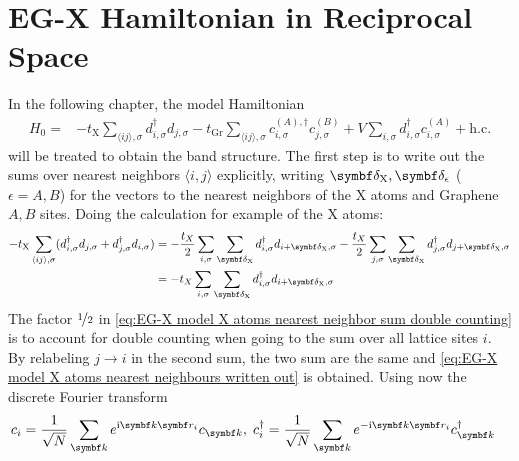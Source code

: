 \documentclass[../main.tex]{subfiles}
\begin{document}
	\chapter{EG-X Hamiltonian in Reciprocal Space}
	
	
	In the following chapter, the model Hamiltonian
	\begin{align}
		H_0 = &-t_{\mathrm{X}} \sum_{\langle ij \rangle, \sigma} d_{i, \sigma}^{\dagger} d_{j, \sigma}
		-t_{\mathrm{Gr}} \sum_{\langle ij \rangle, \sigma}
		c_{i, \sigma}^{(A), \dagger} c_{j, \sigma}^{(B)}
		+ V \sum_{i, \sigma} d_{i, \sigma}^{\dagger} c_{i, \sigma}^{(A)} + \mathrm{h.c.} \label{eq:EG-X model Hamiltonian non-interacting appendix}
	\end{align}
	will be treated to obtain the band structure. The first step is to write out the sums over nearest neighbors \(\langle i, j \rangle\) explicitly, writing \(\vb{\delta}_{\mathrm{X}}, \vb{\delta}_{\epsilon}\) (\(\epsilon = A, B\)) for the vectors to the nearest neighbors of the \(\mathrm{X}\) atoms and Graphene \(A, B\) sites.
	Doing the calculation for example of the \(\mathrm{X}\) atoms:
	\begin{align}
		-t_{\mathrm{X}} \sum_{\langle ij \rangle, \sigma} (d_{i, \sigma}^{\dagger} d_{j, \sigma} + d_{j, \sigma}^{\dagger} d_{i, \sigma})
		&= -\frac{t_X}{2} \sum_{i,\sigma} \sum_{\vb{\delta}_{\mathrm{X}}} d_{i, \sigma}^{\dagger} d_{i + \vb{\delta}_{\mathrm{X}}, \sigma}
		-\frac{t_X}{2} \sum_{j,\sigma} \sum_{\vb{\delta}_{\mathrm{X}}} d_{j, \sigma}^{\dagger} d_{j + \vb{\delta}_{\mathrm{X}}, \sigma} \label{eq:EG-X model X atoms nearest neighbor sum double counting} \\
		&= -t_X \sum_{i,\sigma} \sum_{\vb{\delta}_{\mathrm{X}}} d_{i, \sigma}^{\dagger} d_{i + \vb{\delta}_{\mathrm{X}}, \sigma} \label{eq:EG-X model X atoms nearest neighbours written out}
	\end{align}
	The factor \(\nicefrac{1}{2}\) in \cref{eq:EG-X model X atoms nearest neighbor sum double counting} is to account for double counting when going to the sum over all lattice sites \(i\).
	By relabeling \(j \to i\) in the second sum, the two sum are the same and \cref{eq:EG-X model X atoms nearest neighbours written out} is obtained.
	Using now the discrete Fourier transform
	\begin{align}
		c_{i} &= \frac{1}{\sqrt{N}} \sum_{\vb{k}} e^{\iu \vb{k} \vb{r}_{i}} c_{\vb{k}} ,\;
		c_{i}^{\dagger} = \frac{1}{\sqrt{N}} \sum_{\vb{k}} e^{-\iu \vb{k} \vb{r}_{i}} c_{\vb{k}}^{\dagger}
	\end{align}
\end{document}
